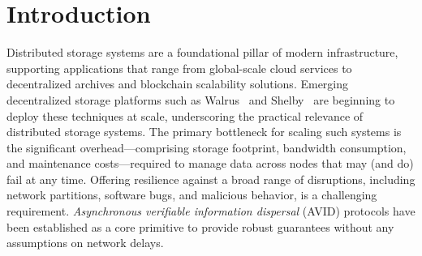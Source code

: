 \documentclass[sigconf,screen]{acmart}
\begin{document}
\begin{abstract}
The primary goal of a distributed storage system is to ensure that clients can both write and read data in a reliable and consistent manner, even in the presence of failures. While existing asynchronous verifiable information dispersal (AVID) protocols achieve optimal space complexity for storage and communication complexity for data retrieval in a Byzantine setting, the crucial operations of data dispersal and node recovery have received less attention.
We propose an efficient AVID protocol that simultaneously guarantees low complexities for dispersal, storage, retrieval, and recovery. At the core of the proposed protocol lies a novel mechanism to encode data in a two-dimensional matrix and a bespoke dispersal algorithm. The protocol maintains an optimal communication complexity for retrieval while substantially improving upon the state of the art for recovery.
Additionally, we describe a protocol variant that offers a reduced space complexity and communication complexity for dispersal, at the expense of a higher communication complexity for recovery and, depending on its parameterization, also retrieval.
As the proposed protocols strike a balance across all considered metrics, they are suitable for a broad range of real-world use cases.
\end{abstract}


\maketitle


\section{Introduction}
\label{sec:introduction}

Distributed storage systems are a foundational pillar of modern infrastructure, supporting applications that range from global-scale cloud services to decentralized archives and blockchain scalability solutions. Emerging decentralized storage platforms such as Walrus~\cite{danezis2025} and Shelby~\cite{goren2025} are beginning to deploy these techniques at scale, underscoring the practical relevance of distributed storage systems.
The primary bottleneck for scaling such systems is the significant overhead---comprising storage footprint, bandwidth consumption, and maintenance costs---required to manage data across nodes that may (and do) fail at any time.
Offering resilience against a broad range of disruptions, including network partitions, software bugs, and malicious behavior, is a challenging requirement.
\emph{Asynchronous verifiable information dispersal} (AVID) protocols have been established as a core primitive to provide robust guarantees without any assumptions on network delays.
\end{document}
